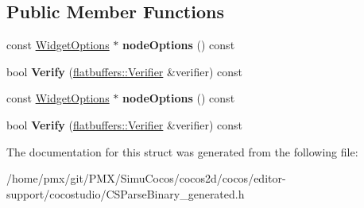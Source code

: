 \subsection*{Public Member Functions}
\begin{DoxyCompactItemize}
\item 
\mbox{\label{structflatbuffers_1_1SingleNodeOptions_ad6b5b205adb657b25acea216685643c6}} 
const \hyperlink{structflatbuffers_1_1WidgetOptions}{Widget\+Options} $\ast$ {\bfseries node\+Options} () const
\item 
\mbox{\label{structflatbuffers_1_1SingleNodeOptions_a564087f30432505fa509f2ac01234eee}} 
bool {\bfseries Verify} (\hyperlink{classflatbuffers_1_1Verifier}{flatbuffers\+::\+Verifier} \&verifier) const
\item 
\mbox{\label{structflatbuffers_1_1SingleNodeOptions_ad6b5b205adb657b25acea216685643c6}} 
const \hyperlink{structflatbuffers_1_1WidgetOptions}{Widget\+Options} $\ast$ {\bfseries node\+Options} () const
\item 
\mbox{\label{structflatbuffers_1_1SingleNodeOptions_a564087f30432505fa509f2ac01234eee}} 
bool {\bfseries Verify} (\hyperlink{classflatbuffers_1_1Verifier}{flatbuffers\+::\+Verifier} \&verifier) const
\end{DoxyCompactItemize}


The documentation for this struct was generated from the following file\+:\begin{DoxyCompactItemize}
\item 
/home/pmx/git/\+P\+M\+X/\+Simu\+Cocos/cocos2d/cocos/editor-\/support/cocostudio/C\+S\+Parse\+Binary\+\_\+generated.\+h\end{DoxyCompactItemize}
